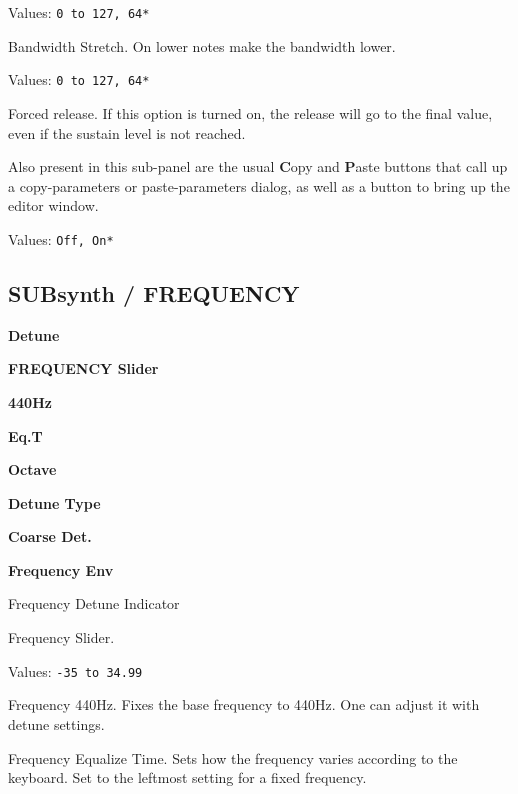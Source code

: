    Values: \texttt{0 to 127, 64*}

   Bandwidth Stretch. On lower notes make the bandwidth lower.

   Values: \texttt{0 to 127, 64*}

   Forced release.
   If this option is turned on, the release will go to the
   final value, even if the sustain level is not reached.

   Also present in this sub-panel are the usual \textbf{C}opy
   and \textbf{P}aste buttons that call up a copy-parameters or
   paste-parameters dialog, as well as a button
   to bring up the editor window.

   Values: \texttt{Off, On*}

\subsection{SUBsynth / FREQUENCY}
\label{subsec:subsynth_frequency}

   \begin{enumber}
      \item \textbf{Detune}
      \item \textbf{FREQUENCY Slider}
      \item \textbf{440Hz}
      \item \textbf{Eq.T}
      \item \textbf{Octave}
      \item \textbf{Detune Type}
      \item \textbf{Coarse Det.}
      \item \textbf{Frequency Env}
   \end{enumber}

   \setcounter{ItemCounter}{0}      %

   Frequency Detune Indicator

   Frequency Slider.

   Values: \texttt{-35 to 34.99}

   Frequency 440Hz.
   Fixes the base frequency to 440Hz.
   One can adjust it with detune settings.

   Frequency Equalize Time.
   Sets how the frequency varies according to the keyboard.
   Set to the leftmost setting for a fixed frequency.

